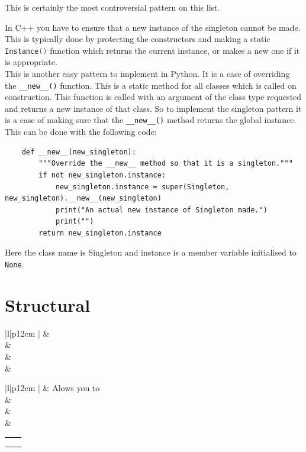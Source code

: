 \documentclass[12pt, oneside]{book} %
\newcommand{\HRule}{\rule{\linewidth}{0.5mm}} %
\newcommand{\tmpsection}[1]{}
\let\tmpsection=\section
\renewcommand{\section}[1]{
  { 
    \samepage{
      \vspace{10 mm} \linespread{0.75} \color{RoyalBlue}{
        \noindent \HRule \tmpsection{#1} \noindent \HRule
      }
    }
  }
}
\newcommand{\patternSummaryGoalMotProCon}[4]{
  \begin{center}
    \begin{tabular}{|l|p{12cm} |}
      \hline
      \color{RoyalBlue}{Goal} & #1
      \\
      \hline
      \color{RoyalBlue}{Motivation} & #2
      \\ 
      \hline
      \color{RoyalBlue}{Pros} & #3
      \\ 
      \hline
      \color{RoyalBlue}{Cons} & #4
      \\ 
      \hline
    \end{tabular}
  \end{center}
}
\begin{document}
This is certainly the most controversial pattern on this list. 

In C++ you have to ensure that a new instance of the singleton cannot be made. This is typically done by protecting the constructors and making a static \lstinline[language = c++]{Instance()} function which returns the current instance, or makes a new one if it is appropriate. \\

This is another easy pattern to implement in Python. It is a case of overriding the \lstinline{__new__()} function. This is a static method for all classes which is called on construction. This function is called with an argument of the class type requested and returns a new instance of that class. So to implement the singleton pattern it is a case of making sure that the \lstinline{__new__()} method returns the global instance. This can be done with the following code:
\begin{lstlisting}
    def __new__(new_singleton):
        """Override the __new__ method so that it is a singleton."""
        if not new_singleton.instance:
            new_singleton.instance = super(Singleton, new_singleton).__new__(new_singleton)
            print("An actual new instance of Singleton made.")
            print("")
        return new_singleton.instance
\end{lstlisting}
Here the class name is Singleton and instance is a member variable initialised to \lstinline{None}.

\chapter{Structural}

\section{Adapter}
\patternSummaryGoalMotProCon{}{}{}{}

\section{Bridge}
\patternSummaryGoalMotProCon{Alows you to}{}{}{}

\section{Composite}
\patternSummaryGoalMotProCon{}{}{}{}
\end{document}
